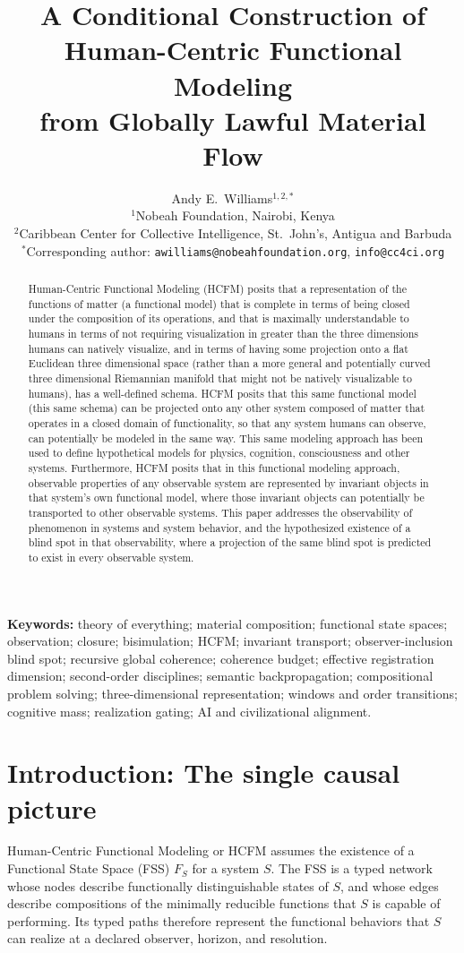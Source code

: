 \documentclass[11pt]{article}
\title{A Conditional Construction of Human-Centric Functional Modeling\\
from Globally Lawful Material Flow}
\author{Andy E.\ Williams$^{1,2,*}$\\[4pt]
\small $^1$Nobeah Foundation, Nairobi, Kenya\\
\small $^2$Caribbean Center for Collective Intelligence, St.\ John's, Antigua and Barbuda\\[2pt]
\small $^*$Corresponding author: \texttt{awilliams@nobeahfoundation.org}, \texttt{info@cc4ci.org}}
\date{}
\theoremstyle{definition}
\begin{document}
\maketitle
\begin{abstract}
Human-Centric Functional Modeling (HCFM) posits that a representation of the functions of matter (a functional model) that is complete in terms of being closed under the composition of its operations, and that is maximally understandable to humans in terms of not requiring visualization in greater than the three dimensions humans can natively visualize, and in terms of having some projection onto a flat Euclidean three dimensional space (rather than a more general and potentially curved three dimensional Riemannian manifold that might not be natively visualizable to humans), has a well-defined schema. HCFM posits that this same functional model (this same schema) can be projected onto any other system composed of matter that operates in a closed domain of functionality, so that any system humans can observe, can potentially be modeled in the same way. This same modeling approach has been used to define hypothetical models for physics, cognition, consciousness and other systems. Furthermore, HCFM posits that in this functional modeling approach, observable properties of any observable system are represented by invariant objects in that system’s own functional model, where those invariant objects can potentially be transported to other observable systems. This paper addresses the observability of phenomenon in systems and system behavior, and the hypothesized existence of a blind spot in that observability, where a projection of the same blind spot is predicted to exist in every observable system.
\end{abstract}

\noindent\textbf{Keywords:} theory of everything; material composition; functional state spaces; observation; closure; bisimulation; HCFM; invariant transport; observer-inclusion blind spot; recursive global coherence; coherence budget; effective registration dimension; second-order disciplines; semantic backpropagation; compositional problem solving; three-dimensional representation; windows and order transitions; cognitive mass; realization gating; AI and civilizational alignment.


\section{Introduction: The single causal picture}
Human-Centric Functional Modeling or HCFM \cite{williams2021human} assumes the existence of a Functional State Space (FSS) $F_S$ for a system $S$. The FSS is a typed network whose nodes describe functionally distinguishable states of $S$, and whose edges describe compositions of the minimally reducible functions that $S$ is capable of performing. Its typed paths therefore represent the functional behaviors that $S$ can realize at a declared observer, horizon, and resolution.
\end{document}
